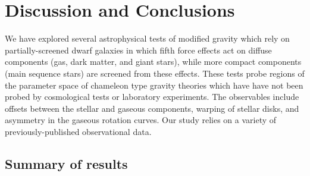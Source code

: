 \documentclass{emulateapj}
\begin{document}
\section{Discussion and Conclusions}

\label{sec:discussion}
We have explored several astrophysical tests of modified gravity which rely on
partially-screened dwarf galaxies in which fifth force effects act on
diffuse components (gas, dark matter, and giant stars), while more
compact components (main sequence stars) are screened from these effects.
These tests probe regions of the parameter space of chameleon type gravity
theories which have have not been probed by cosmological tests or
laboratory experiments.  The observables include offsets between the stellar
and gaseous components, warping of stellar disks, and asymmetry in the
gaseous rotation curves. Our study relies on a variety of previously-published
observational data.

\subsection{Summary of results}
\end{document}
